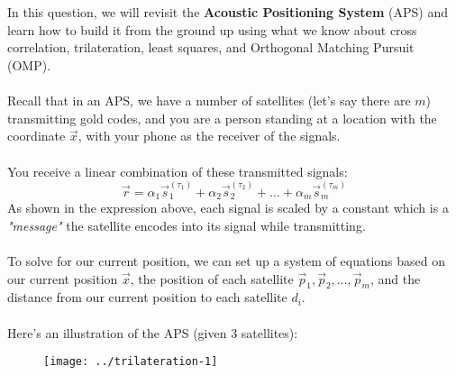 \\ \\
In this question, we will revisit the \textbf{Acoustic Positioning System} (APS) and learn how to build it from the ground up using what we know about cross correlation, trilateration, least squares, and Orthogonal Matching Pursuit (OMP).
\\ \\
Recall that in an APS, we have a number of satellites (let's say there are $m$) transmitting gold codes, and you are a person standing at a location with the coordinate $\vec{x}$, with your phone as the receiver of the signals.
\\ \\
You receive a linear combination of these transmitted signals:
$$\vec{r} = \alpha_1 \vec{s}_1^{(\tau_1)} + \alpha_2 \vec{s}_2^{(\tau_2)} + \hdots + \alpha_m \vec{s}_m^{(\tau_m)}$$
As shown in the expression above, each signal is scaled by a constant which is a \textit{"message"} the satellite encodes into its signal while transmitting.
\\ \\
To solve for our current position, we can set up a system of equations based on our current position $\vec{x}$, the position of each satellite $\vec{p}_1, \vec{p}_2, \hdots, \vec{p}_m$, and the distance from our current position to each satellite $d_i$.
\\ \\
Here's an illustration of the APS (given 3 satellites):
\begin{figure}[H]
    \centering
    \texttt{[image: ../trilateration-1]}
\end{figure}

